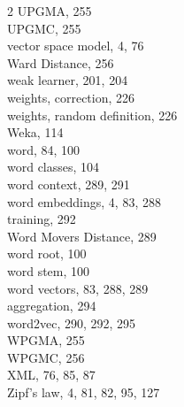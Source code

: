 \documentclass[11pt,openany,executivepaper]{book}
\begin{document}
\begin{multicols}{2}
UPGMA, 255\\
UPGMC, 255\\
vector space model, 4, 76\\
Ward Distance, 256\\
weak learner, 201, 204\\
weights, correction, 226\\
weights, random definition, 226\\
Weka, 114\\
word, 84, 100\\
word classes, 104\\
word context, 289, 291\\
word embeddings, 4, 83, 288\\
training, 292\\
Word Movers Distance, 289\\
word root, 100\\
word stem, 100\\
word vectors, 83, 288, 289\\
aggregation, 294\\
word2vec, 290, 292, 295\\
WPGMA, 255\\
WPGMC, 256\\
XML, 76, 85, 87\\
Zipf's law, 4, 81, 82, 95, 127
\end{multicols}
\end{document}
